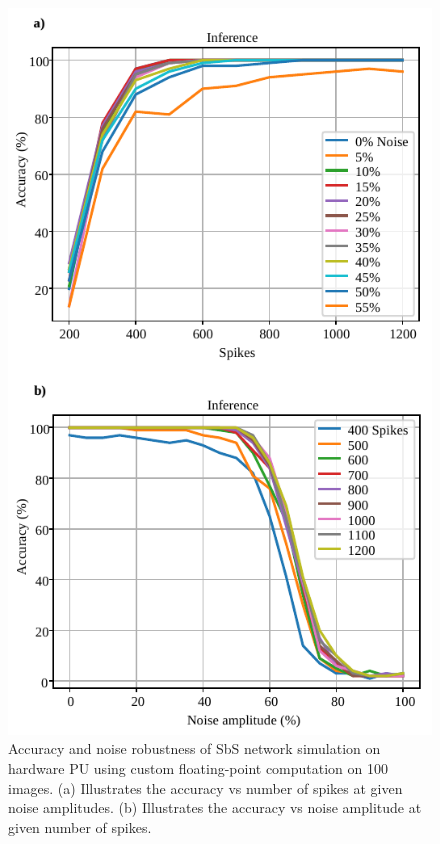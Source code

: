 \begin{figure}[h!]
	\centering
	\includegraphics[width=1\columnwidth]{../figures/accuracy_vs_noise_pu_cfp(4-bit-exponent_1-bit-mantissa).pdf}
	\caption{Accuracy and noise robustness of SbS network simulation on hardware PU using custom floating-point computation on 100 images. (a) Illustrates the accuracy vs number of spikes at given noise amplitudes. (b) Illustrates the accuracy vs noise amplitude at given number of spikes.}
	\label{fig:accuracy_vs_noise_pu_cfp}
\end{figure}

